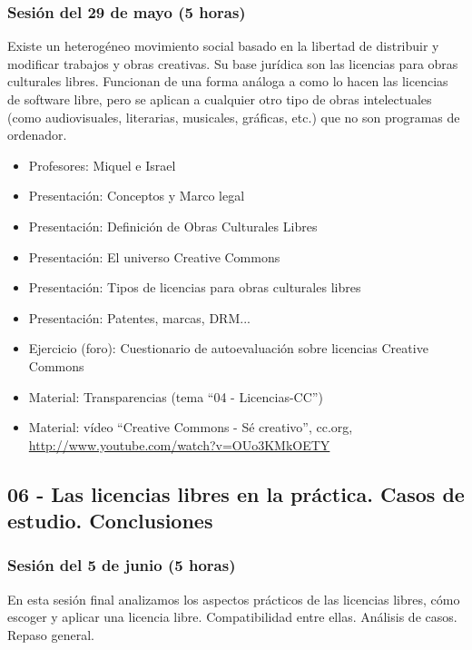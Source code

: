 \documentclass[a4paper,12pt]{article}
\begin{document}
\subsubsection{Sesión del 29 de mayo (5 horas)}

Existe un heterogéneo movimiento social basado en la libertad de distribuir y modificar trabajos y obras creativas. Su base jurídica son las licencias para obras culturales libres. Funcionan de una forma análoga a como lo hacen las licencias de software libre, pero se aplican a cualquier otro tipo de obras intelectuales (como audiovisuales, literarias, musicales, gráficas, etc.) que no son programas de ordenador.

 \begin{itemize}
 \item Profesores: Miquel e Israel
 \item Presentación: Conceptos y Marco legal
 \item Presentación: Definición de Obras Culturales Libres 
 \item Presentación: El universo Creative Commons
 \item Presentación: Tipos de licencias para obras culturales libres
 \item Presentación: Patentes, marcas, DRM...
 \item Ejercicio (foro): Cuestionario de autoevaluación sobre licencias Creative Commons \\
 \item Material: Transparencias (tema ``04 - Licencias-CC'')
 \item Material: vídeo ``Creative Commons - Sé creativo'', cc.org, \\
   \url{http://www.youtube.com/watch?v=OUo3KMkOETY}
 \end{itemize}

\subsection{06 - Las licencias libres en la práctica. Casos de estudio. Conclusiones}

\subsubsection{Sesión del 5 de junio (5 horas)}

En esta sesión final analizamos los aspectos prácticos de las licencias libres, cómo escoger y aplicar una licencia libre. Compatibilidad entre ellas. Análisis de casos. Repaso general.
\end{document}
